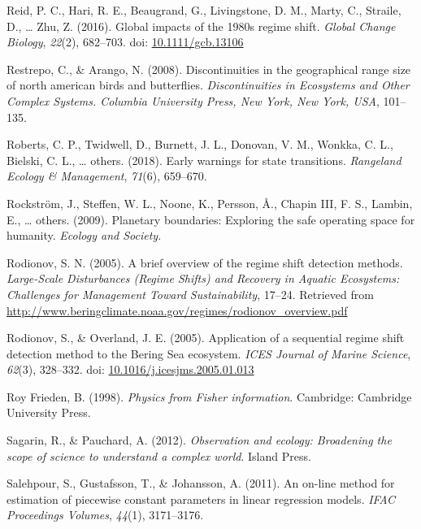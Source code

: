 \documentclass[12pt,twoside,openany]{reedthesis}
\begin{document}
\leavevmode\hypertarget{ref-reid_global_2016}{}%
Reid, P. C., Hari, R. E., Beaugrand, G., Livingstone, D. M., Marty, C., Straile, D., \ldots{} Zhu, Z. (2016). Global impacts of the 1980s regime shift. \emph{Global Change Biology}, \emph{22}(2), 682--703. doi: \href{https://doi.org/10.1111/gcb.13106}{10.1111/gcb.13106}

\leavevmode\hypertarget{ref-restrepo2008discontinuities}{}%
Restrepo, C., \& Arango, N. (2008). Discontinuities in the geographical range size of north american birds and butterflies. \emph{Discontinuities in Ecosystems and Other Complex Systems. Columbia University Press, New York, New York, USA}, 101--135.

\leavevmode\hypertarget{ref-roberts2018early}{}%
Roberts, C. P., Twidwell, D., Burnett, J. L., Donovan, V. M., Wonkka, C. L., Bielski, C. L., \ldots{} others. (2018). Early warnings for state transitions. \emph{Rangeland Ecology \& Management}, \emph{71}(6), 659--670.

\leavevmode\hypertarget{ref-rockstrom_planetary_2009}{}%
Rockström, J., Steffen, W. L., Noone, K., Persson, Å., Chapin III, F. S., Lambin, E., \ldots{} others. (2009). Planetary boundaries: Exploring the safe operating space for humanity. \emph{Ecology and Society}.

\leavevmode\hypertarget{ref-rodionov_brief_2005}{}%
Rodionov, S. N. (2005). A brief overview of the regime shift detection methods. \emph{Large-Scale Disturbances (Regime Shifts) and Recovery in Aquatic Ecosystems: Challenges for Management Toward Sustainability}, 17--24. Retrieved from \url{http://www.beringclimate.noaa.gov/regimes/rodionov_overview.pdf}

\leavevmode\hypertarget{ref-rodionov_application_2005}{}%
Rodionov, S., \& Overland, J. E. (2005). Application of a sequential regime shift detection method to the Bering Sea ecosystem. \emph{ICES Journal of Marine Science}, \emph{62}(3), 328--332. doi: \href{https://doi.org/10.1016/j.icesjms.2005.01.013}{10.1016/j.icesjms.2005.01.013}

\leavevmode\hypertarget{ref-frieden_physics_1998}{}%
Roy Frieden, B. (1998). \emph{Physics from Fisher information}. Cambridge: Cambridge University Press.

\leavevmode\hypertarget{ref-sagarin_observation_2012}{}%
Sagarin, R., \& Pauchard, A. (2012). \emph{Observation and ecology: Broadening the scope of science to understand a complex world}. Island Press.

\leavevmode\hypertarget{ref-salehpour2011line}{}%
Salehpour, S., Gustafsson, T., \& Johansson, A. (2011). An on-line method for estimation of piecewise constant parameters in linear regression models. \emph{IFAC Proceedings Volumes}, \emph{44}(1), 3171--3176.
\end{document}
